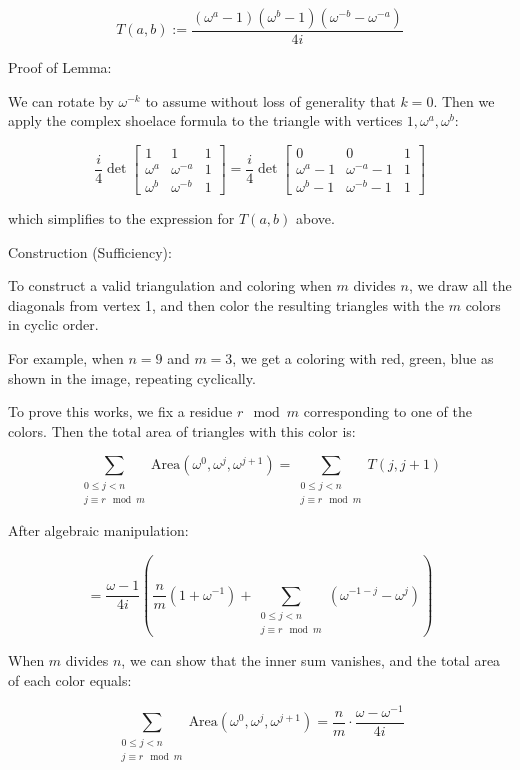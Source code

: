 \begin{enumerate}
 
 \[T(a, b) := \frac{(\omega^a - 1)(\omega^b - 1)(\omega^{-b} - \omega^{-a})}{4i}\]

 Proof of Lemma:

 We can rotate by $\omega^{-k}$ to assume without loss of generality that $k = 0$. Then we apply the complex shoelace formula to the triangle with vertices $1, \omega^a, \omega^b$:

 
 \[\frac{i}{4} \det \begin{bmatrix} 1 & 1 & 1 \\ \omega^a & \omega^{-a} & 1 \\ \omega^b & \omega^{-b} & 1 \end{bmatrix} = \frac{i}{4} \det \begin{bmatrix} 0 & 0 & 1 \\ \omega^a - 1 & \omega^{-a} - 1 & 1 \\ \omega^b - 1 & \omega^{-b} - 1 & 1 \end{bmatrix}\]

 which simplifies to the expression for $T(a, b)$ above.

 Construction (Sufficiency):

 To construct a valid triangulation and coloring when $m$ divides $n$, we draw all the diagonals from vertex 1, and then color the resulting triangles with the $m$ colors in cyclic order.

 For example, when $n = 9$ and $m = 3$, we get a coloring with red, green, blue as shown in the image, repeating cyclically.

 To prove this works, we fix a residue $r \mod m$ corresponding to one of the colors. Then the total area of triangles with this color is:

 
 \[\sum_{\substack{0 \leq j < n \\ j \equiv r \mod m}} \text{Area}(\omega^0, \omega^j, \omega^{j+1}) = \sum_{\substack{0 \leq j < n \\ j \equiv r \mod m}} T(j, j+1)\]

 After algebraic manipulation:

 
 \[= \frac{\omega - 1}{4i} \left(\frac{n}{m}(1 + \omega^{-1}) + \sum_{\substack{0 \leq j < n \\ j \equiv r \mod m}} (\omega^{-1-j} - \omega^j)\right)\]

 When $m$ divides $n$, we can show that the inner sum vanishes, and the total area of each color equals:

 
 \[\sum_{\substack{0 \leq j < n \\ j \equiv r \mod m}} \text{Area}(\omega^0, \omega^j, \omega^{j+1}) = \frac{n}{m} \cdot \frac{\omega - \omega^{-1}}{4i}\]


\end{enumerate}
